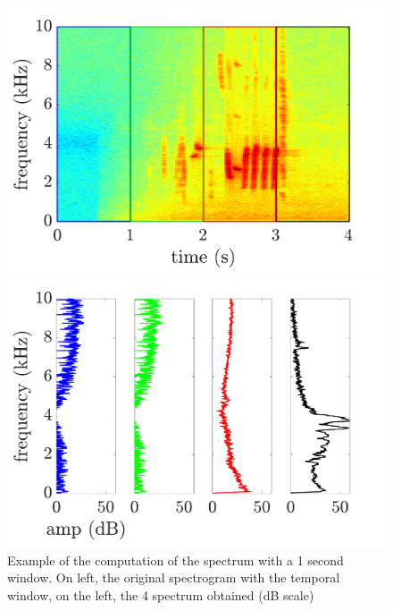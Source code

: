 \documentclass[twocolumn,a4paper,10pt]{article}
\begin{document}
\begin{figure}[!t]
\centering
	\begin{minipage}[t]{.24\textwidth}
		\centering
		\includegraphics[width=\linewidth]{../image/extractionDictionary1Example.pdf}
	\end{minipage}
	\begin{minipage}[t]{.24\textwidth}
		\centering
		\includegraphics[width=\linewidth]{../image/extractionDictionary2Example.pdf}
	\end{minipage}
	\caption{Example of the computation of the spectrum with a 1 second window. On left, the original spectrogram with the temporal window, on the left, the 4 spectrum obtained (dB scale)}
	\label{fig:dictionaryExtraction}
\end{figure}
\end{document}
